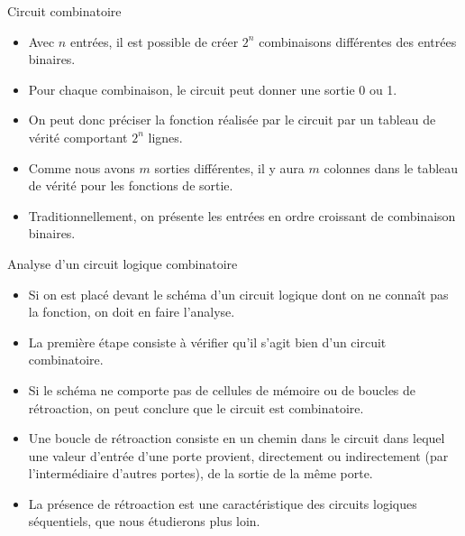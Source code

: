 \documentclass[presentation]{beamer}
\begin{document}
\begin{frame}[label={sec:org7a71ccd}]{Circuit combinatoire}
\begin{itemize}
\item Avec \(n\) entrées, il est possible de créer \(2^n\) combinaisons différentes des entrées binaires.

\item Pour chaque combinaison, le circuit peut donner une sortie 0 ou 1.

\item On peut donc préciser la fonction réalisée par le circuit par un tableau de vérité comportant \(2^n\) lignes.

\item Comme nous avons \(m\) sorties différentes, il y aura \(m\) colonnes dans le tableau de vérité pour les fonctions de sortie.

\item Traditionnellement, on présente les entrées en ordre croissant de combinaison binaires.
\end{itemize}
\end{frame}

\begin{frame}[label={sec:orge657b28}]{Analyse d'un circuit logique combinatoire}
\begin{itemize}
\item Si on est placé devant le schéma d'un circuit logique dont on ne connaît pas la fonction, on doit en faire l'analyse.

\item La première étape consiste à vérifier qu'il s'agit bien d'un circuit combinatoire.

\item Si le schéma ne comporte pas de cellules de mémoire ou de boucles de rétroaction, on peut conclure que le circuit est combinatoire.

\item Une boucle de rétroaction consiste en un chemin dans le circuit dans lequel une valeur d'entrée d'une porte provient, directement ou indirectement (par l'intermédiaire d'autres portes), de la sortie de la même porte.

\item La présence de rétroaction est une caractéristique des circuits logiques séquentiels, que nous étudierons plus loin.
\end{itemize}
\end{frame}
\end{document}
